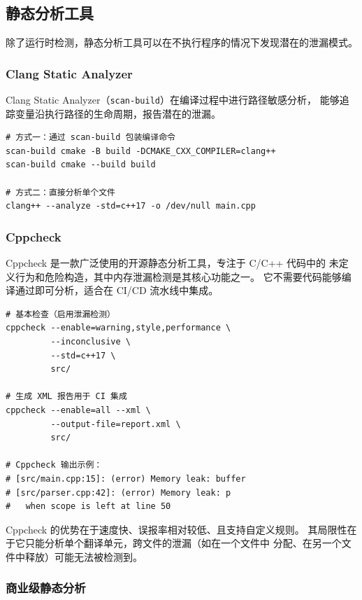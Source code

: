 \documentclass[12pt,a4paper,fontset=fandol]{ctexbook}
\begin{document}
\subsection{静态分析工具}

除了运行时检测，静态分析工具可以在不执行程序的情况下发现潜在的泄漏模式。

\subsubsection*{Clang Static Analyzer}

Clang Static Analyzer（\texttt{scan-build}）在编译过程中进行路径敏感分析，
能够追踪变量沿执行路径的生命周期，报告潜在的泄漏。

\begin{lstlisting}[style=bashstyle, caption={使用 Clang Static Analyzer}]
# 方式一：通过 scan-build 包装编译命令
scan-build cmake -B build -DCMAKE_CXX_COMPILER=clang++
scan-build cmake --build build

# 方式二：直接分析单个文件
clang++ --analyze -std=c++17 -o /dev/null main.cpp
\end{lstlisting}

\subsubsection*{Cppcheck}

Cppcheck 是一款广泛使用的开源静态分析工具，专注于 C/C++ 代码中的
未定义行为和危险构造，其中内存泄漏检测是其核心功能之一。
它不需要代码能够编译通过即可分析，适合在 CI/CD 流水线中集成。

\begin{lstlisting}[style=bashstyle, caption={Cppcheck 使用示例}]
# 基本检查（启用泄漏检测）
cppcheck --enable=warning,style,performance \
         --inconclusive \
         --std=c++17 \
         src/

# 生成 XML 报告用于 CI 集成
cppcheck --enable=all --xml \
         --output-file=report.xml \
         src/

# Cppcheck 输出示例：
# [src/main.cpp:15]: (error) Memory leak: buffer
# [src/parser.cpp:42]: (error) Memory leak: p
#   when scope is left at line 50
\end{lstlisting}

Cppcheck 的优势在于速度快、误报率相对较低、且支持自定义规则。
其局限性在于它只能分析单个翻译单元，跨文件的泄漏（如在一个文件中
分配、在另一个文件中释放）可能无法被检测到。

\subsubsection*{商业级静态分析}
\end{document}
